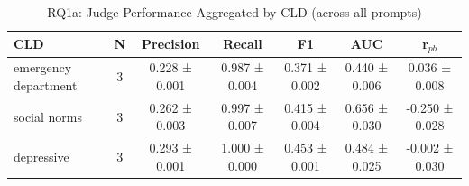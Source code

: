 \begin{table}[htbp]
\centering
\caption{RQ1a: Judge Performance Aggregated by CLD (across all prompts)}
\label{tab:rq1a_by_cld}
\begin{tabular}{lcccccc}
\toprule
\textbf{CLD} & \textbf{N} & \textbf{Precision} & \textbf{Recall} & \textbf{F1} & \textbf{AUC} & \textbf{r$_{pb}$} \\
\midrule
emergency department & 3 & 0.228 ± 0.001 & 0.987 ± 0.004 & 0.371 ± 0.002 & 0.440 ± 0.006 & 0.036 ± 0.008 \\
social norms & 3 & 0.262 ± 0.003 & 0.997 ± 0.007 & 0.415 ± 0.004 & 0.656 ± 0.030 & -0.250 ± 0.028 \\
depressive & 3 & 0.293 ± 0.001 & 1.000 ± 0.000 & 0.453 ± 0.001 & 0.484 ± 0.025 & -0.002 ± 0.030 \\
\bottomrule
\end{tabular}
\end{table}